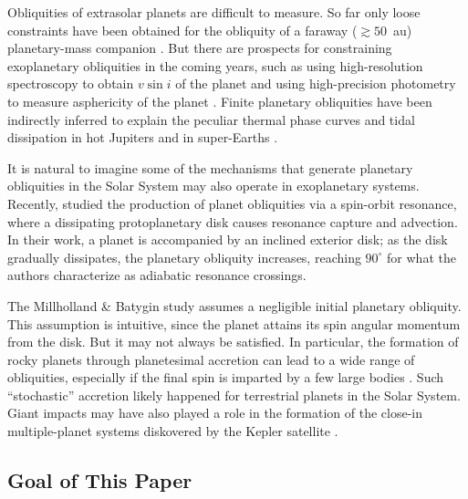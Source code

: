 \documentclass[twocolumn,twocolappendix]{aastex63}
\begin{document}
Obliquities of extrasolar planets are difficult to measure. So far only loose
constraints have been obtained for the obliquity of a faraway ($\gtrsim 50$~au)
planetary-mass companion \citep{bryan2020obliquity}. But there are prospects for
constraining exoplanetary obliquities in the coming years, such as using
high-resolution spectroscopy to obtain $v\sin i$ of the planet
\citep{snellen2014fast, bryan2018constraints} and using high-precision
photometry to measure asphericity of the planet \citep{seager2002constraining}.
Finite planetary obliquities have been indirectly inferred to explain the
peculiar thermal phase curves \citep[see e.g.][]{millholland_signatures,
ohno_infer_obl} and tidal dissipation in hot Jupiters
\citep{millholland_wasp12b} and in super-Earths
\citep{millholland2019obliquity}.

It is natural to imagine some of the mechanisms that generate planetary
obliquities in the Solar System may also operate in exoplanetary systems.
Recently, \citet{millholland_disk} studied the production of planet obliquities
via a spin-orbit resonance, where a dissipating protoplanetary disk causes
resonance capture and advection. In their work, a planet is accompanied by an
inclined exterior disk; as the disk gradually dissipates, the planetary
obliquity increases, reaching $90^\circ$ for what the authors characterize as
adiabatic resonance crossings.

The Millholland \& Batygin study assumes a negligible initial planetary
obliquity. This assumption is intuitive, since the planet attains its spin
angular momentum from the disk. But it may not always be satisfied. In
particular, the formation of rocky planets through planetesimal accretion can
lead to a wide range of obliquities, especially if the final spin is imparted by
a few large bodies \citep{dones1993does, lissauer1997accretion,
miguel2010planet}. Such ``stochastic'' accretion likely happened for terrestrial
planets in the Solar System. Giant impacts may have also played a role in the
formation of the close-in multiple-planet systems diskovered by the Kepler
satellite \citep[e.g.][]{inamdar2015formation, izidoro2017breaking}.

\subsection{Goal of This Paper}
\end{document}
